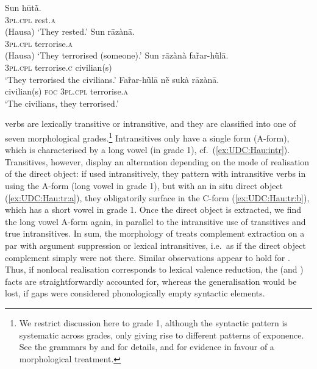\documentclass[output=paper,biblatex,babelshorthands,newtxmath,draftmode,colorlinks,citecolor=brown]{langscibook}
\begin{document}
\ea
\gll Sun hūtā̀.\\
  \textsc{3pl.cpl} rest.\textsc{a}\\\hfill(Hausa)
\glt `They rested.' \hfill \label{ex:UDC:Hau:intr}
\z
\eal
\label{ex:UDC:Hau:tr}
    \ex\label{ex:UDC:Hau:tr:a} 
    \gll Sun rāzànā.\footnotemark\\
         \textsc{3pl.cpl} terrorise.\textsc{a}\\\hfill{(Hausa)}
    \glt `They terrorised (someone).'
    \ex\label{ex:UDC:Hau:tr:b} 
    \gll Sun rāzànà far̃ar-hū̀lā.\footnotemark\\
         \textsc{3pl.cpl} terrorise.\textsc{c} civilian(s)\\
    \glt `They terrorised the civilians.'
    \ex 
    \gll Far̃ar-hū̀lā nḕ sukà rāzànā.\\
         civilian(s) \textsc{foc} \textsc{3pl.cpl} terrorise.\textsc{a}\\
    \glt `The civilians, they terrorised.' 
\zl

\noindent
{} verbs are lexically transitive or intransitive, and they
are classified into one of seven morphological grades.\footnote{We
  restrict discussion here to grade 1, although the syntactic pattern
  is systematic across grades, only giving rise to different patterns
  of exponence. See the  grammars by \citet{newman_p00} and
  \citet{jaggar01:_hausa} for details, and \citet{crysmann_b04yom} for
  evidence in favour of a morphological treatment. } Intransitives
only have a single form (A-form), which is characterised by a long
vowel (in grade 1), cf.\ (\ref{ex:UDC:Hau:intr}). Transitives, however,
display an alternation depending on the mode of realisation of the
direct object: if used intransitively, they pattern with intransitive
verbs in using the A-form (long vowel in grade 1), but with an in situ
direct object (\ref{ex:UDC:Hau:tr:a}), they obligatorily surface in
the C-form (\ref{ex:UDC:Hau:tr:b}), which has a short vowel in grade
1. Once the direct object is extracted, we find the long vowel A-form
again, in parallel to the intransitive use of transitives and true
intransitives. In sum, the morphology of  treats complement
extraction on a par with argument suppression or lexical
intransitives, i.e.\ as if the direct object complement simply were
not there. Similar observations appear to hold for 
\citep[Section~4.2.3]{Henri2010a-u}. Thus, if nonlocal realisation
corresponds to lexical valence reduction, the  (and
) facts are straightforwardly accounted for, whereas
the generalisation would be lost, if gaps were considered
phonologically empty syntactic elements.
\end{document}
